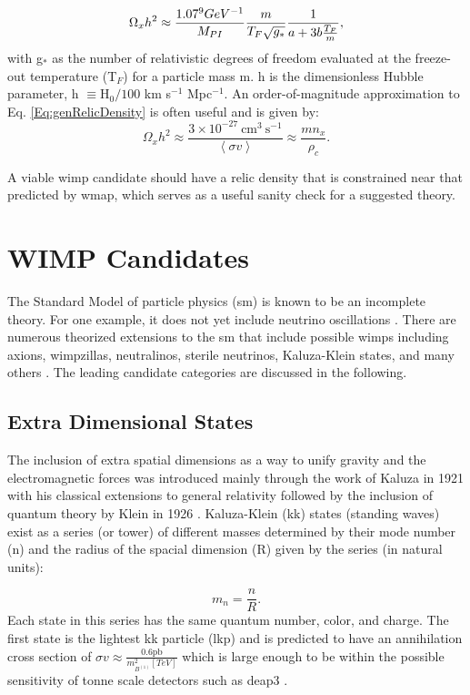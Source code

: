 \begin{equation}
\label{Eq:genRelicDensity}
\Omega_x h^2 \approx \frac{1.07 \time 10^9 GeV^{-1}}{M_{PI}} \frac{m}{T_F\sqrt{g_*}} \frac{1}{a + 3b \frac{T_F}{m}},
\end{equation}
with g$_*$ as the number of relativistic degrees of freedom evaluated at the freeze-out temperature (T$_F$) for a particle mass m. h is the dimensionless Hubble parameter, h $\equiv \text{H}_0/100$ km s$^{-1}$ Mpc$^{-1}$. An order-of-magnitude approximation to Eq. \eqref{Eq:genRelicDensity} is often useful and is given by:
\begin{equation}
\label{Eq:genRelicDensityApprox}
\Omega_x h^2 \approx \frac{3 \times 10^{-27} \ \text{cm}^{3} \ \text{s}^{-1}}{\left< \sigma v \right>} \approx \frac{m n_x}{\rho_c}.
\end{equation}

A viable \gls{wimp} candidate should have a relic density that is constrained near that predicted by \gls{wmap}, which serves as a useful sanity check for a suggested theory. 


\section{WIMP Candidates}
The Standard Model of particle physics (\gls{sm}) is known to be an incomplete theory. For one example, it does not yet include neutrino oscillations \cite{SMIntro}. There are numerous theorized extensions to the \gls{sm} that include possible \gls{wimp}s including axions, \gls{wimp}zillas, neutralinos, sterile neutrinos, Kaluza-Klein states, and many others \cite{particlDarkMatterReview}. The leading candidate categories are discussed in the following.


\subsection{Extra Dimensional States}
The inclusion of extra spatial dimensions as a way to unify gravity and the electromagnetic forces was introduced mainly through the work of Kaluza in 1921 \cite{kaluza1921unitatsproblem} with his classical extensions to general relativity followed by the inclusion of quantum theory by Klein in 1926 \cite{kleinStates}. Kaluza-Klein (\gls{kk}) states (standing waves) exist as a series (or tower) of different masses determined by their mode number (n) and the radius of the spacial dimension (R) given by the series (in natural units):

\begin{equation}
\label{Eq:kkTower}
m_n = \frac{n}{R}.
\end{equation}
Each state in this series has the same quantum number, color, and charge. The first state is the lightest \gls{kk} particle (\gls{lkp}) and is predicted to have an annihilation cross section of $\sigma v \approx \frac{0.6 \text{pb}}{m^2_{B^{(1)}}[TeV]}$ which is large enough to be within the possible sensitivity of tonne scale detectors such as \gls{deap3} \cite{SMIntro}\cite{particlDarkMatterReview}.


